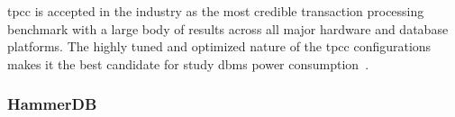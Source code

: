 \gls{tpcc} is accepted in the industry as the most credible transaction processing benchmark with a large body of results across all major hardware and database platforms. The highly tuned and optimized nature of the \gls{tpcc} configurations makes it the best candidate for study \gls{dbms} power consumption~\cite{powerconsumptiontppc}.

\subsubsection{HammerDB}


